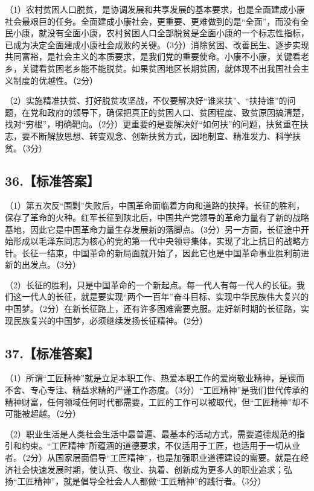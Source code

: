 \documentclass[UTF8,11pt]{ctexart}
\begin{document}
（1）农村贫困人口脱贫，是协调发展和共享发展的基本要求，也是全面建成小康社会最艰巨的任务。全面建成小康社会，更重要、更难做到的是“全面”，而没有全民小康，就没有全面小康，农村贫困人口全部脱贫是全面小康的一个标志性指标，已成为决定全面建成小康社会成败的关键。（3分）消除贫困、改善民生、逐步实现共同富裕，是社会主义的本质要求，是我们党的重要使命。小康不小康，关键看老乡，关键看贫困老乡能不能脱贫。如果贫困地区长期贫困，就体现不出我国社会主义制度的优越性。（2分）


（2）实施精准扶贫、打好脱贫攻坚战，不仅要解决好“谁来扶”、“扶持谁”的问题，在党和政府的领导下，确保把真正的贫困人口、贫困程度、致贫原因搞清楚，找对“穷根”，明确靶向。（2分）更重要的是要解决好“如何扶”的问题，扶贫重在扶志，要不断解放思想、转变观念、创新扶贫方式，因地制宜、精准发力、科学扶贫。（3分）


\subsection*{36.【标准答案】}

（1）第五次反“围剿”失败后，中国革命面临着方向和道路的抉择。长征的胜利，保存了革命的火种。红军长征到陕北后，中国共产党领导的革命力量有了新的战略基地，因此它是中国革命力量生存发展新的落脚点。（3分）另一方面，长征途中开始形成以毛泽东同志为核心的党的第一代中央领导集体，实现了北上抗日的战略方针。长征一结束，中国革命的新局面就开始了，因此它也是中国革命事业胜利前进新的出发点。（3分）


（2）长征的胜利，只是中国革命的一个新起点。每一代人有每一代人的长征。我们这一代人的长征，就是要实现“两个一百年”奋斗目标、实现中华民族伟大复兴的中国梦。（2分）在新长征路上，还有许多困难需要克服。走好新时期的长征路，实现民族复兴的中国梦，必须继续发扬长征精神。（2分）


\subsection*{37.【标准答案】}

（1）所谓“工匠精神”就是立足本职工作、热爱本职工作的爱岗敬业精神，是锲而不舍、专心专注、精益求精的严谨工作态度。（3分）“工匠精神”是我们世代传承的精神财富，任何领域任何时代都需要，工匠的工作可以被取代，但“工匠精神”却不可能被超越。（2分）


（2）职业生活是人类社会生活中最普遍、最基本的活动方式，需要道德规范的指引和约束。“工匠精神”所蕴涵的道德要求，不仅适用于工匠，也适用于一切从业者。（2分）从国家层面倡导“工匠精神”，也是加强职业道德建设的需要。就是在经济社会快速发展时期，使认真、敬业、执着、创新成为更多人的职业追求；弘扬“工匠精神”，就是倡导全社会人人都做“工匠精神”的践行者。（3分）
\end{document}
